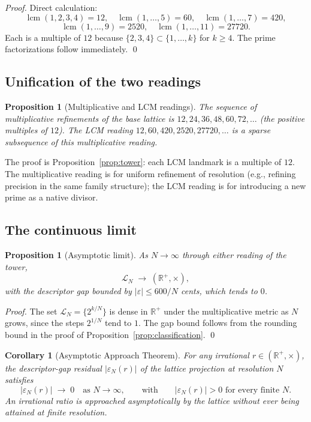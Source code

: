 \documentclass[11pt,a4paper]{article}
\newtheorem{corollary}[theorem]{Corollary}
\newtheorem{proposition}[theorem]{Proposition}
\theoremstyle{definition}
\theoremstyle{remark}
\newcommand{\R}{\mathbb{R}}
\DeclareMathOperator{\lcm}{lcm}
\newcommand{\eps}{\varepsilon}
\begin{document}
\begin{proof}
Direct calculation:
\[
\lcm(1,2,3,4)=12,\quad \lcm(1,\ldots,5)=60,\quad \lcm(1,\ldots,7)=420,
\]
\[
\lcm(1,\ldots,9)=2520,\quad \lcm(1,\ldots,11)=27720.
\]
Each is a multiple of $12$ because $\{2,3,4\}\subset\{1,\ldots,k\}$ for $k\ge 4$. The prime factorizations follow immediately. \qed
\end{proof}

\subsection{Unification of the two readings}

\begin{proposition}[Multiplicative and LCM readings]\label{prop:unification}
The sequence of multiplicative refinements of the base lattice is $12,24,36,48,60,72,\ldots$ (the positive multiples of $12$). The LCM reading $12,60,420,2520,27720,\ldots$ is a sparse subsequence of this multiplicative reading.
\end{proposition}

The proof is Proposition~\ref{prop:tower}: each LCM landmark is a multiple of $12$. The multiplicative reading is for uniform refinement of resolution (e.g., refining precision in the same family structure); the LCM reading is for introducing a new prime as a native divisor.

\subsection{The continuous limit}

\begin{proposition}[Asymptotic limit]\label{prop:limit}
As $N\to\infty$ through either reading of the tower,
\[
\mathcal{L}_{N} \;\longrightarrow\; (\R^{+},\times),
\]
with the descriptor gap bounded by $|\eps|\le 600/N$ cents, which tends to $0$.
\end{proposition}

\begin{proof}
The set $\mathcal{L}_{N}=\{2^{k/N}\}$ is dense in $\R^{+}$ under the multiplicative metric as $N$ grows, since the steps $2^{1/N}$ tend to $1$. The gap bound follows from the rounding bound in the proof of Proposition~\ref{prop:classification}. \qed
\end{proof}

\begin{corollary}[Asymptotic Approach Theorem]\label{cor:asymptotic-approach}
For any irrational $r \in (\R^{+},\times)$, the descriptor-gap residual $|\varepsilon_{N}(r)|$ of the lattice projection at resolution $N$ satisfies
\[
|\varepsilon_{N}(r)| \;\longrightarrow\; 0 \quad \text{as } N \to \infty, \qquad\text{with}\qquad |\varepsilon_{N}(r)| > 0 \text{ for every finite } N.
\]
An irrational ratio is approached asymptotically by the lattice without ever being attained at finite resolution.
\end{corollary}
\end{document}
